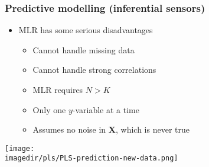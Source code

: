 %
%
%
%

\begin{frame}\frametitle{Predictive modelling (inferential sensors)}
	\begin{itemize}
		\item	MLR has some serious disadvantages
		\begin{itemize}
			\item	Cannot handle missing data
			\item	Cannot handle strong correlations
			\item	MLR requires $N > K$
			\item	Only one $y$-variable at a time
			\item	Assumes no noise in $\mathbf{X}$, which is never true
		\end{itemize}
	\end{itemize}

	\texttt{[image: \\imagedir/pls/PLS-prediction-new-data.png]}
\end{frame}

